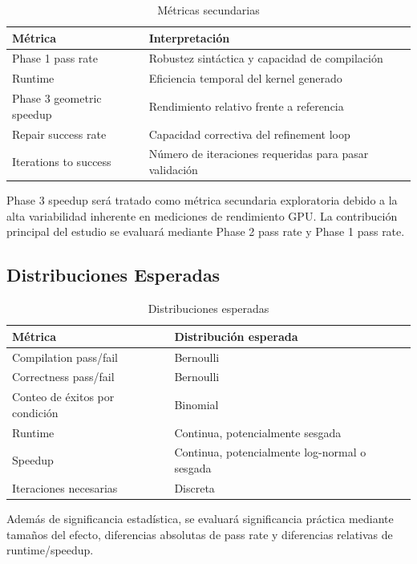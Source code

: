 \documentclass[12pt]{article}
\begin{document}
\begin{table}[H]
\centering
\begin{tabular}{p{} p{}}
\toprule
\textbf{Métrica} & \textbf{Interpretación} \\
\midrule
Phase 1 pass rate & Robustez sintáctica y capacidad de compilación \\
Runtime & Eficiencia temporal del kernel generado \\
Phase 3 geometric speedup & Rendimiento relativo frente a referencia \\
Repair success rate & Capacidad correctiva del refinement loop \\
Iterations to success & Número de iteraciones requeridas para pasar validación \\
\bottomrule
\end{tabular}
\caption{Métricas secundarias}
\end{table}

Phase 3 speedup será tratado como métrica secundaria exploratoria debido a la alta variabilidad inherente en mediciones de rendimiento GPU. La contribución principal del estudio se evaluará mediante Phase 2 pass rate y Phase 1 pass rate.

\subsection{Distribuciones Esperadas}

\begin{table}[H]
\centering
\begin{tabular}{p{} p{}}
\toprule
\textbf{Métrica} & \textbf{Distribución esperada} \\
\midrule
Compilation pass/fail & Bernoulli \\
Correctness pass/fail & Bernoulli \\
Conteo de éxitos por condición & Binomial \\
Runtime & Continua, potencialmente sesgada \\
Speedup & Continua, potencialmente log-normal o sesgada \\
Iteraciones necesarias & Discreta \\
\bottomrule
\end{tabular}
\caption{Distribuciones esperadas}
\end{table}

Además de significancia estadística, se evaluará significancia práctica mediante tamaños del efecto, diferencias absolutas de pass rate y diferencias relativas de runtime/speedup.
\end{document}
